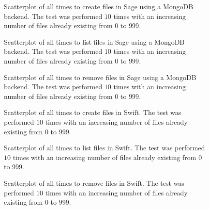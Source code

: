 \begin{figure}[!h]
\centering
{}
\caption[SageMongo Create Scatterplot]{Scatterplot of all times to create files in Sage using a MongoDB backend. The test was performed $10$ times with an increasing number of files already existing from $0$ to $999$.}
\label{fig:sagemongocreatescatter}
\end{figure}

\begin{figure}[!h]
\centering
{}
\caption[SageMongo List Scatterplot]{Scatterplot of all times to list files in Sage using a MongoDB backend. The test was performed $10$ times with an increasing number of files already existing from $0$ to $999$.}
\label{fig:sagemongolistscatter}
\end{figure}

\begin{figure}[!h]
\centering
{}
\caption[SageMongo Remove Scatterplot]{Scatterplot of all times to remove files in Sage using a MongoDB backend. The test was performed $10$ times with an increasing number of files already existing from $0$ to $999$.}
\label{fig:sagemongoremovescatter}
\end{figure}

\begin{figure}[!h]
\centering
{}
\caption[Swift Create Scatterplot]{Scatterplot of all times to create files in Swift. The test was performed $10$ times with an increasing number of files already existing from $0$ to $999$.}
\label{fig:swiftcreatescatter}
\end{figure}

\clearpage

\begin{figure}[!h]
\centering
{}
\caption[Swift List Scatterplot]{Scatterplot of all times to list files in Swift. The test was performed $10$ times with an increasing number of files already existing from $0$ to $999$.}
\label{fig:swiftlistscatter}
\end{figure}

\begin{figure}[!h]
\centering
{}
\caption[Swift Remove Scatterplot]{Scatterplot of all times to remove files in Swift. The test was performed $10$ times with an increasing number of files already existing from $0$ to $999$.}
\label{fig:mongoremovescatter}
\end{figure}


